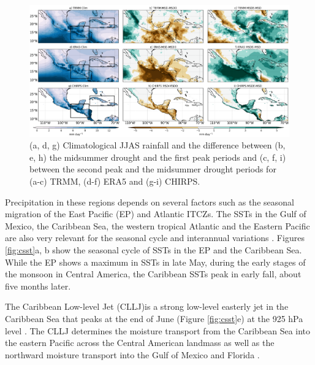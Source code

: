   \begin{figure}[t!]
\includegraphics[width=\linewidth]{figures/fig2obs_prdiff_2.png}
\caption{ (a, d, g) Climatological JJAS rainfall and the difference between  (b, e, h)  the midsummer drought and the first peak periods and (c, f, i)  between the second peak and the midsummer drought periods for (a-c) TRMM, (d-f) ERA5 and (g-i) CHIRPS.}
\label{fig:eof2}
\end{figure}

 


Precipitation in these regions depends on several factors such as the seasonal migration of the East Pacific (EP) and Atlantic ITCZs. The SSTs in the Gulf of Mexico, the Caribbean Sea, the western tropical Atlantic and the Eastern Pacific are also very relevant for the seasonal cycle and interannual variations \citep{magana1999,amador2008,straffon2019}. Figures \ref{fig:csst}a, b show the seasonal cycle of SSTs in the EP and the Caribbean Sea. While the EP shows a maximum in SSTs in late May, during the early stages of the monsoon in Central America, the Caribbean SSTs peak in early fall, about five months later. 


The Caribbean Low-level Jet (CLLJ)is a strong low-level easterly jet in the Caribbean Sea that peaks at the end of June (Figure \ref{fig:csst}e) at the 925 hPa level \citep{amador2008,herrera2015,maldonado2016}. The CLLJ  determines the moisture transport from the Caribbean Sea into the eastern Pacific across the Central American landmass as well as the northward moisture transport into the Gulf of Mexico and Florida \citep{munoz2008,hidalgo2015,maldonado2016}.


